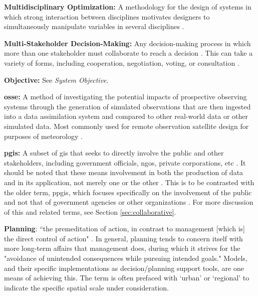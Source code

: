 \textbf{Multidisciplinary Optimization:} A methodology for the design of systems in which strong interaction between disciplines motivates designers to simultaneously manipulate variables in several disciplines \cite{sobieszczanski-sobieskiMultidisciplinaryAerospaceDesign1997}.

\textbf{Multi-Stakeholder Decision-Making:} Any decision-making process in which more than one stakeholder must collaborate to reach a decision \cite{fitzgeraldRecommendationsFramingMultistakeholder2016}. This can take a variety of forms, including cooperation, negotiation, voting, or consultation \cite{garberMultiStakeholderTradeSpace2015}.

\textbf{Objective:} See \textit{System Objective}.

\textbf{\acf{osse}:} A method of investigating the potential impacts of prospective observing systems through the generation of simulated observations that are then ingested into a data assimilation system and compared to other real-world data or other simulated data. Most commonly used for remote observation satellite design for purposes of meteorology \cite{masutaniObservingSystemSimulation2010} .


\textbf{\acf{pgis}:} A subset of \ac{gis} that seeks to directly involve the public and other stakeholders, including government officials, \acp{ngo}, private corporations, etc \cite{sieberPublicParticipationGeographic2006}. It should be noted that these means involvement in both the production of data and in its application, not merely one or the other \cite{weinerParticipatoryGeographicInformation2007, talenBottomUpGIS2000}. This is to be contrasted with the older term, \ac{ppgis}, which focuses specifically on the involvement of the public and not that of government agencies or other organizations \cite{sieberPublicParticipationGeographic2006}. For more discussion of this and related terms, see Section \ref{sec:collaborative}.

\textbf{Planning}: ``the premeditation of action, in contrast to management [which is] the direct control of action" \cite{harrisLocationalModelsGeographic1993}. In general, planning tends to concern itself with more long-term affairs that management does, during which it strives for the "avoidance of unintended consequences while pursuing intended goals." Models, and their specific implementations as decision/planning support tools, are one means of achieving this. The term is often prefaced with `urban' or `regional' to indicate the specific spatial scale under consideration.

